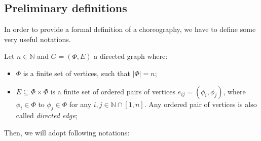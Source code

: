 \documentclass[12pt,a4paper]{report}
\newcommand{\N}{\mathbb{N}}
\begin{document}
\subsection{Preliminary definitions}

In order to provide a formal definition of a choreography, we have to define some very useful notations. 

Let $n \in \N$ and $G = (\Phi,E)$ a directed graph where:

\begin{itemize}
	\item $\Phi$ is a finite set of vertices, such that $|\Phi| = n$;
	\item  $E \subseteq \Phi \times \Phi $ is a finite set of ordered pairs of vertices $e_{ij} = \left( \phi_i, \phi_j \right)$, where $\phi_i \in \Phi$ to $\phi_j \in \Phi$ for any $i,j \in \N \cap \left[ 1, n \right]$. Any ordered pair of vertices is also called \textit{directed edge};
\end{itemize}

Then, we will adopt following notations:
\end{document}
